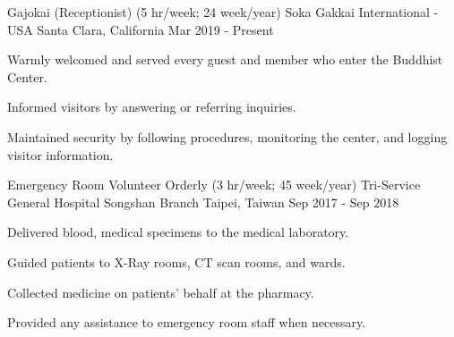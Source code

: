 

\begin{cventries}

  \cventry
    {Gajokai (Receptionist) (5 hr/week; 24 week/year)} %
    {Soka Gakkai International - USA} %
    {Santa Clara, California} %
    {Mar 2019 - Present} %
    {
	\begin{cvitems} %
      	\item Warmly welcomed and served every guest and member who enter the Buddhist Center.
      	\item Informed visitors by answering or referring inquiries.
      	\item Maintained security by following procedures, monitoring the center, and logging visitor information.
	\end{cvitems}
    }
    
  \cventry
    {Emergency Room Volunteer Orderly (3 hr/week; 45 week/year)} %
    {Tri-Service General Hospital Songshan Branch} %
    {Taipei, Taiwan} %
    {Sep 2017 - Sep 2018} %
    {
	\begin{cvitems} %
      	\item Delivered blood, medical specimens to the medical laboratory.
		\item Guided patients to X-Ray rooms, CT scan rooms, and wards.       
      	\item Collected medicine on patients' behalf at the pharmacy.
      	\item Provided any assistance to emergency room staff when necessary.
	\end{cvitems}
    }


\end{cventries}
